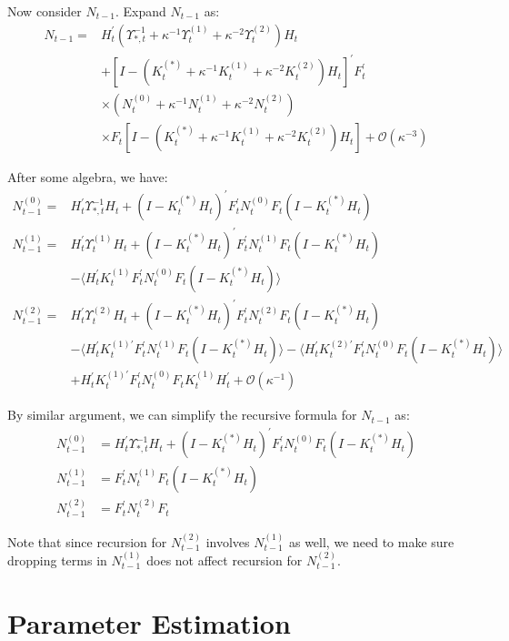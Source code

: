 \documentclass[10pt]{article}
\numberwithin{equation}{section}
\begin{document}
Now consider $N_{t-1}$. Expand $N_{t-1}$ as:
\begin{align*}
    N_{t-1} =& H_t^{'}(\Upsilon_{*,t}^{-1}+\kappa^{-1}\Upsilon_{t}^{(1)}+\kappa^{-2}\Upsilon_t^{(2)})H_t \\
    &+ [I-(K_t^{(*)}+\kappa^{-1}K_t^{(1)}+\kappa^{-2}K_t^{(2)})H_t]^{'}F_t^{'} \\
    &\times (N_t^{(0)}+\kappa^{-1}N_t^{(1)}+\kappa^{-2}N_t^{(2)}) \\
    &\times F_t[I-(K_t^{(*)}+\kappa^{-1}K_t^{(1)}+\kappa^{-2}K_t^{(2)})H_t]+\mathcal{O}(\kappa^{-3})
\end{align*}

After some algebra, we have:
\begin{align*}
    N_{t-1}^{(0)} =& H_t^{'}\Upsilon_{*,t}^{-1}H_t+(I-K_t^{(*)}H_t)^{'}F_t^{'}N_t^{(0)}F_t(I-K_t^{(*)}H_t) \\
    N_{t-1}^{(1)} =& H_t^{'}\Upsilon_t^{(1)}H_t + (I-K_t^{(*)}H_t)^{'}F_t^{'}N_t^{(1)}F_{t}(I-K_t^{(*)}H_t) \\
    &- \langle H_t^{'}K_t^{(1)}F_t^{'}N_t^{(0)}F_t(I-K_t^{(*)}H_t)\rangle \\
    N_{t-1}^{(2)} =& H_t^{'}\Upsilon_t^{(2)}H_t + (I-K_t^{(*)}H_t)^{'}F_t^{'}N_t^{(2)}F_t(I-K_t^{(*)}H_t) \\
    &- \langle H_t^{'}K_{t}^{(1)'}F_t^{'}N_t^{(1)}F_t(I-K_t^{(*)}H_t)\rangle -\langle H_t^{'}K_{t}^{(2)'}F_t^{'}N_t^{(0)}F_t(I-K_t^{(*)}H_t)\rangle \\
    &+ H_t^{'}K_t^{(1)'}F_t^{'}N_t^{(0)}F_tK_t^{(1)}H_t^{'} + \mathcal{O}(\kappa^{-1})
\end{align*}

By similar argument, we can simplify the recursive formula for $N_{t-1}$ as: 
\begin{align}
    N_{t-1}^{(0)} &= H_t^{'}\Upsilon_{*,t}^{-1}H_t+(I-K_t^{(*)}H_t)^{'}F_t^{'}N_t^{(0)}F_t(I-K_t^{(*)}H_t) \label{eq:N_0_start} \\
    N_{t-1}^{(1)} &= F_t^{'}N_t^{(1)}F_t(I-K_t^{(*)}H_t) \\
    N_{t-1}^{(2)} &= F_t^{'}N_t^{(2)}F_t \label{eq:N_0_end}
\end{align}

Note that since recursion for $N_{t-1}^{(2)}$ involves $N_{t-1}^{(1)}$ as well, we need to make sure dropping terms in $N_{t-1}^{(1)}$ does not affect recursion for $N_{t-1}^{(2)}$. 

\section{Parameter Estimation}
\end{document}
